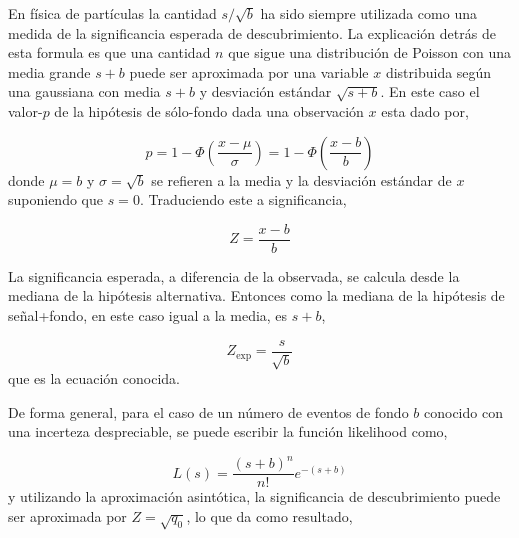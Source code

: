 En física de partículas la cantidad $s/\sqrt{b}$ ha sido siempre utilizada como
una medida de la significancia esperada de descubrimiento\cite{medsigNote}. La
explicación detrás de esta formula es que una cantidad $n$ que sigue una
distribución de Poisson con una media grande $s+b$ puede ser aproximada por una
variable $x$ distribuida según una gaussiana con media $s+b$ y desviación
estándar $\sqrt{s+b}$. En este caso el valor-$p$ de la hipótesis de sólo-fondo
dada una observación $x$ esta dado por,

\begin{equation}
  p = 1 - \Phi \left( \frac{x-\mu}{\sigma} \right) = 1 - \Phi \left(
  \frac{x-b}{b} \right)
\end{equation}
%
donde $\mu=b$ y $\sigma = \sqrt{b}$ se refieren a la media y la desviación
estándar de $x$ suponiendo que $s=0$. Traduciendo este {\pvalue} a significancia,

\begin{equation}
  Z = \frac{x-b}{b}
\end{equation}

La significancia esperada, a diferencia de la observada, se calcula desde la mediana
de la hipótesis alternativa. Entonces como la mediana de la hipótesis de señal+fondo,
en este caso igual a la media, es $s+b$,

\begin{equation}
  Z_\text{exp} = \frac{s}{\sqrt{b}}
  \label{eq:Zsimple}
\end{equation}
%
que es la ecuación conocida. %

De forma general, para el caso de un número de eventos de fondo $b$ conocido con
una incerteza despreciable, se puede escribir la función likelihood como,

\begin{equation}
  L(s) = \frac{(s+b)^n}{n!} e^{-(s+b)}
\end{equation}
%
y utilizando la aproximación asintótica, la significancia de descubrimiento
puede ser aproximada por $Z=\sqrt{q_0}$, lo que da como resultado,

%

